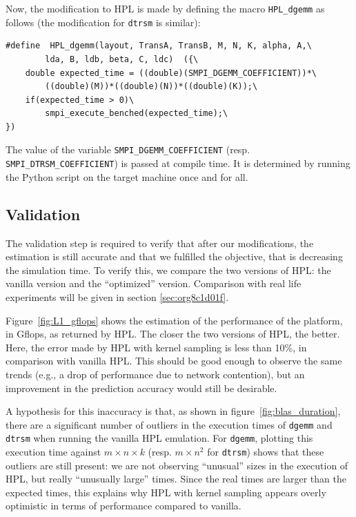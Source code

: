 \documentclass[12pt, a4paper]{memoir}
\begin{document}
Now, the modification to HPL is made by defining the macro \texttt{HPL\_dgemm} as follows (the modification for \texttt{dtrsm} is similar):

\begin{verbatim}
#define  HPL_dgemm(layout, TransA, TransB, M, N, K, alpha, A,\
        lda, B, ldb, beta, C, ldc)  ({\
    double expected_time = ((double)(SMPI_DGEMM_COEFFICIENT))*\
        ((double)(M))*((double)(N))*((double)(K));\
    if(expected_time > 0)\
        smpi_execute_benched(expected_time);\
})
\end{verbatim}

The value of the variable \texttt{SMPI\_DGEMM\_COEFFICIENT} (resp. \texttt{SMPI\_DTRSM\_COEFFICIENT}) is passed at compile time. It is
determined by running the Python script on the target machine once and for all.

\subsection{Validation}
\label{sec:orgbd31c09}
The validation step is required to verify that after our modifications, the estimation is still accurate and that we
fulfilled the objective, that is decreasing the simulation time. To verify this, we compare the two versions of HPL:
the vanilla version and the “optimized” version. Comparison with real life experiments will be given in section
\ref{sec:org8c1d01f}.

Figure~\ref{fig:L1_gflops} shows the estimation of the performance of the platform, in Gflops, as returned by
HPL. The closer the two versions of HPL, the better. Here, the error made by HPL with kernel sampling is less than
10\%, in comparison with vanilla HPL. This should be good enough to observe the same trends (e.g., a drop of
performance due to network contention), but an improvement in the prediction accuracy would still be desirable.

A hypothesis for this inaccuracy is that, as shown in figure~\ref{fig:blas_duration}, there are a significant
number of outliers in the execution times of \texttt{dgemm} and \texttt{dtrsm} when running the vanilla HPL emulation. For \texttt{dgemm},
plotting this execution time against \(m \times n \times k\) (resp. \(m \times n^2\) for \texttt{dtrsm}) shows that these outliers are still
present: we are not observing “unusual” sizes in the execution of HPL, but really “unusually large” times. Since the
real times are larger than the expected times, this explains why HPL with kernel sampling appears overly optimistic
in terms of performance compared to vanilla.
\end{document}
